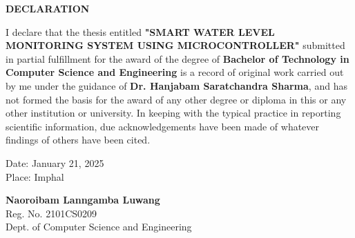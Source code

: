 \vspace*{0.6cm}
\begin{center}
    \fontsize{16}{19}\selectfont
    \textbf{DECLARATION}\\[0.5cm]
\end{center}
\vspace{1cm}
{
\fontsize{12}{14}\selectfont
\noindent
I declare that the thesis entitled \textbf{"SMART WATER LEVEL MONITORING SYSTEM USING MICROCONTROLLER"} submitted in partial fulfillment for the award of the degree of \textbf{Bachelor of Technology in Computer Science and Engineering} is a record of original work carried out by me under the guidance of \textbf{Dr. Hanjabam Saratchandra Sharma}, and has not formed the basis for the award of any other degree or diploma in this or any other institution or university. In keeping with the typical practice in reporting scientific information, due acknowledgements have been made of whatever findings of others have been cited.

\vspace{2cm}
\noindent
\begin{minipage}[t]{0.45\textwidth} %
    \begin{flushleft}
        Date: January 21, 2025\\
        Place: Imphal
    \end{flushleft}
\end{minipage}%
\hfill %
\begin{minipage}[t]{0.45\textwidth} %
    \begin{flushright}
        \begin{center}
            \textbf{Naoroibam Lanngamba Luwang}\\
            Reg. No. 2101CS0209\\
            Dept. of Computer Science and Engineering
        \end{center}
    \end{flushright}
\end{minipage}
} 



